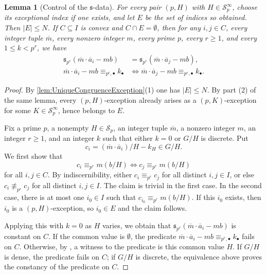 \documentclass{article}
\theoremstyle{definition}
\theoremstyle{remark}
\theoremstyle{plain}
\newtheorem{lem}[dfn]{Lemma}
\begin{document}
\begin{lem}[Control of the $\mathfrak{s}$-data]\label{lem:ControlOfSData}
	For every pair $(p,H)$ with $H\in\mathcal{S}_p^\infty$, choose its exceptional index if one exists, and let $E$ be the set of indices so obtained.
	Then $|E|\leq N$.
	If $C\subseteq I$ is convex and $C\cap E=\emptyset$, then for any $i,j\in C$, every integer tuple $\overline{m}$, every nonzero integer $m$, every prime $p$, every $r\geq 1$, and every $1\leq k<p^r$, we have
	\begin{align*}
		\mathfrak{s}_{p^r}
		(\overline{m}\cdot\overline{a}_i-mb)
		&=
		\mathfrak{s}_{p^r}
		(\overline{m}\cdot\overline{a}_j-mb),\\
		\overline{m}\cdot\overline{a}_i-mb
		\equiv_{p^r,\bullet}k_{\bullet}
		&\Longleftrightarrow
		\overline{m}\cdot\overline{a}_j-mb
		\equiv_{p^r,\bullet}k_{\bullet}.
	\end{align*}
\end{lem}

\begin{proof}
	By \autoref{lem:UniqueCongruenceException}(1) one has $|E|\leq N$.
	By part (2) of the same lemma, every $(p,H)$-exception already arises as a $(p,K)$-exception for some $K\in\mathcal{S}_p^\infty$, hence belongs to $E$.

	Fix a prime $p$, a nonempty $H \in \mathcal{S}_p$, an integer tuple $\overline{m}$, a nonzero integer $m$, an integer $r\geq 1$, and an integer $k$ such that either $k=0$ or $G/H$ is discrete.
	Put
	\[
		c_i
		=
		(\overline{m}\cdot\overline{a}_i)/H-k_H
		\in
		G/H.
	\]
	We first show that
	\[
		c_i \equiv_{p^r} m(b/H) \iff c_j \equiv_{p^r} m(b/H)
	\]
	for all $i,j \in C$.
	By indiscernibility, either $c_i\equiv_{p^r}c_j$ for all distinct $i,j\in I$, or else $c_i\not\equiv_{p^r}c_j$ for all distinct $i,j\in I$.
	The claim is trivial in the first case.
	In the second case, there is at most one $i_0\in I$ such that $c_{i_0} \equiv_{p^r} m(b/H)$.
	If this $i_0$ exists, then $i_0$ is a $(p,H)$-exception, so $i_0\in E$ and the claim follows.

	Applying this with $k=0$ as $H$ varies, we obtain that $\mathfrak{s}_{p^r}(\overline{m}\cdot\overline{a}_i-mb)$ is constant on $C$.
	If the common value is $\emptyset$, the predicate $\overline{m}\cdot\overline{a}_i-mb\equiv_{p^r,\bullet}k_{\bullet}$ fails on $C$.
	Otherwise, by \cite[Lemma 2.21(2)]{Okura2026DisOrd}, a witness to the predicate is this common value $H$.
	If $G/H$ is dense, the predicate fails on $C$; if $G/H$ is discrete, the equivalence above proves the constancy of the predicate on $C$.
\end{proof}
\end{document}
